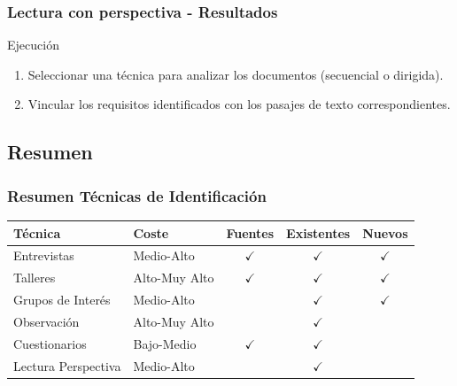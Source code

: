 ﻿\documentclass[handout,a4paper,slidestop,xcolor=pst,dvips,blue]{beamer}
\begin{document}
\begin{frame}[t]
    \frametitle{Lectura con perspectiva - Resultados}
    \begin{block}{Ejecución}
        \begin{enumerate}
            \item<1-> Seleccionar una técnica para analizar los documentos (secuencial o dirigida).
            \item<2-> Vincular los requisitos identificados con los pasajes de texto correspondientes.
        \end{enumerate}
    \end{block}
\end{frame}

\subsection{Resumen}

\begin{frame}[c]
    \frametitle{Resumen Técnicas de Identificación}
    \begin{center}
    \begin{tabular}{||l|l|c|c|c||}
        \hline \hline
        \textbf{Técnica}    & \textbf{Coste} & \textbf{Fuentes} & \textbf{Existentes} & \textbf{Nuevos} \\ \hline \hline
        Entrevistas         & Medio-Alto     & $\checkmark$     & $\checkmark$        & $\checkmark$    \\ \hline
        Talleres            & Alto-Muy Alto  & $\checkmark$     & $\checkmark$        & $\checkmark$    \\ \hline
        Grupos de Interés   & Medio-Alto     &                  & $\checkmark$        & $\checkmark$    \\ \hline
        Observación         & Alto-Muy Alto  &                  & $\checkmark$        &                 \\ \hline
        Cuestionarios       & Bajo-Medio     & $\checkmark$     & $\checkmark$        &                 \\ \hline
        Lectura Perspectiva & Medio-Alto     &                  & $\checkmark$        &                 \\ \hline
        \hline
    \end{tabular}
    \end{center}
\end{frame}
\end{document}
